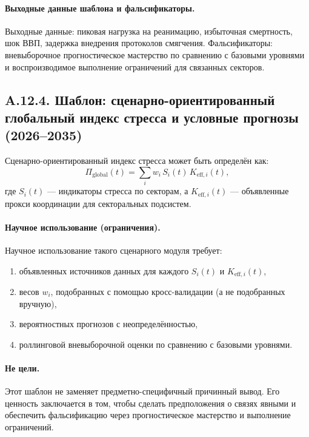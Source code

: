 \documentclass[11pt,a4paper]{article}
\begin{document}
	\paragraph{Выходные данные шаблона и фальсификаторы.}
	Выходные данные: пиковая нагрузка на реанимацию, избыточная смертность, шок ВВП, задержка внедрения протоколов смягчения.
	Фальсификаторы: вневыборочное прогностическое мастерство по сравнению с базовыми уровнями и воспроизводимое выполнение ограничений для связанных секторов.
	
	\subsection*{A.12.4. Шаблон: сценарно-ориентированный глобальный индекс стресса и условные прогнозы (2026--2035)}
	
	Сценарно-ориентированный индекс стресса может быть определён как:
	$$
	\Pi_{\mathrm{global}}(t) = \sum_i w_i\,S_i(t)\,K_{\mathrm{eff},i}(t),
	$$
	где $S_i(t)$ — индикаторы стресса по секторам, а $K_{\mathrm{eff},i}(t)$ — объявленные прокси координации для секторальных подсистем.
	
	\paragraph{Научное использование (ограничения).}
	Научное использование такого сценарного модуля требует:
	\begin{enumerate}[leftmargin=*]
		\item объявленных источников данных для каждого $S_i(t)$ и $K_{\mathrm{eff},i}(t)$,
		\item весов $w_i$, подобранных с помощью кросс-валидации (а не подобранных вручную),
		\item вероятностных прогнозов с неопределённостью,
		\item роллинговой вневыборочной оценки по сравнению с базовыми уровнями.
	\end{enumerate}
	
	\paragraph{Не цели.}
	Этот шаблон не заменяет предметно-специфичный причинный вывод. Его ценность заключается в том, чтобы сделать предположения о связях явными и обеспечить фальсификацию через прогностическое мастерство и выполнение ограничений.
	
\end{document}
